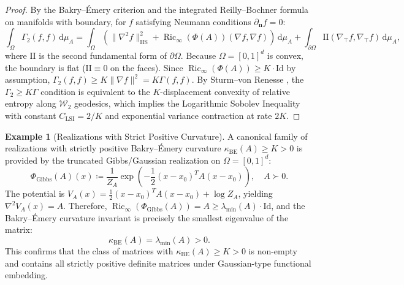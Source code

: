 \documentclass[11pt,a4paper,reqno]{amsart}
\theoremstyle{definition}
\newtheorem{example}[theorem]{Example}
\numberwithin{equation}{section}
\newcommand{\Id}{\mathrm{Id}}
\newcommand{\dif}{\,\mathrm{d}}
\newcommand{\Ric}{\operatorname{Ric}}
\begin{document}
\begin{proof}
By the Bakry--\'Emery criterion \cite{bakry1985diffusions} and the integrated Reilly--Bochner formula on manifolds with boundary, for $f$ satisfying Neumann conditions $\partial_{\mathbf{n}} f = 0$:
\begin{equation}
    \int_\Omega \Gamma_2(f, f) \dif \mu_A = \int_\Omega \left( \|\nabla^2 f\|_{\mathrm{HS}}^2 + \Ric_\infty(\Phi(A))(\nabla f, \nabla f) \right) \dif \mu_A + \int_{\partial\Omega} \mathrm{II}(\nabla_\top f, \nabla_\top f) \dif\mu_A,
\end{equation}
where $\mathrm{II}$ is the second fundamental form of $\partial\Omega$. Because $\Omega = [0, 1]^d$ is convex, the boundary is flat ($\mathrm{II} \equiv 0$ on the faces). Since $\Ric_\infty(\Phi(A)) \ge K \cdot \mathrm{Id}$ by assumption, $\Gamma_2(f, f) \ge K \|\nabla f\|^2 = K \Gamma(f, f)$. By Sturm--von Renesse \cite{von2005transport}, the $\Gamma_2 \ge K \Gamma$ condition is equivalent to the $K$-displacement convexity of relative entropy along $\mathcal{W}_2$ geodesics, which implies the Logarithmic Sobolev Inequality with constant $C_{\mathrm{LSI}} = 2/K$ and exponential variance contraction at rate $2K$.
\end{proof}

\begin{example}[Realizations with Strict Positive Curvature]
\label{ex:positive_curvature}
A canonical family of realizations with strictly positive Bakry--\'Emery curvature $\kappa_{\mathrm{BE}}(A) \ge K > 0$ is provided by the truncated Gibbs/Gaussian realization on $\Omega = [0, 1]^d$:
\begin{equation}
    \Phi_{\mathrm{Gibbs}}(A)(x) \coloneqq \frac{1}{Z_A} \exp\left( -\frac{1}{2} (x - x_0)^T A (x - x_0) \right), \quad A \succ 0.
\end{equation}
The potential is $V_A(x) = \frac{1}{2} (x - x_0)^T A (x - x_0) + \log Z_A$, yielding $\nabla^2 V_A(x) = A$. Therefore, $\Ric_\infty(\Phi_{\mathrm{Gibbs}}(A)) = A \ge \lambda_{\min}(A) \cdot \Id$, and the Bakry--\'Emery curvature invariant is precisely the smallest eigenvalue of the matrix:
\begin{equation}
    \kappa_{\mathrm{BE}}(A) = \lambda_{\min}(A) > 0.
\end{equation}
This confirms that the class of matrices with $\kappa_{\mathrm{BE}}(A) \ge K > 0$ is non-empty and contains all strictly positive definite matrices under Gaussian-type functional embedding.
\end{example}
\end{document}
